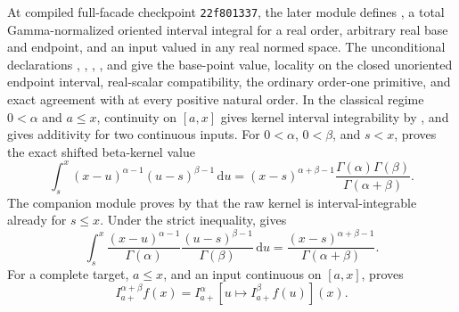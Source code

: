 \documentclass[11pt,oneside]{article}
\theoremstyle{definition}
\theoremstyle{remark}
\newcommand{\dd}{\,\mathrm d}
\newcommand{\1}{\mathbf 1}
\begin{document}
\begin{statusbox}
At compiled full-facade checkpoint \texttt{22f801337}, the later module
 defines
, a total Gamma-normalized oriented interval integral for
a real order, arbitrary real base and endpoint, and an input valued in any real normed
space.  The unconditional declarations
,
,
,
, and
 give the base-point value, locality on the
closed unoriented endpoint interval, real-scalar compatibility, the ordinary order-one
primitive, and exact agreement with  at every positive natural
order.  In the classical regime \(0<\alpha\) and \(a\le x\), continuity on \([a,x]\)
gives kernel interval integrability by
, and
 gives additivity for two continuous inputs.
For \(0<\alpha\), \(0<\beta\), and \(s<x\),
 proves the exact shifted
beta-kernel value
\begin{equation}
 \int_s^x(x-u)^{\alpha-1}(u-s)^{\beta-1}\dd u
 =(x-s)^{\alpha+\beta-1}
   \frac{\Gamma(\alpha)\Gamma(\beta)}{\Gamma(\alpha+\beta)}.
 \label{p0:eq:fractional-volterra-beta-kernel}
\end{equation}
The companion module  proves by
 that the raw kernel is
interval-integrable already for \(s\le x\).  Under the strict inequality,
 gives
\begin{equation}
 \int_s^x
 \frac{(x-u)^{\alpha-1}}{\Gamma(\alpha)}
 \frac{(u-s)^{\beta-1}}{\Gamma(\beta)}\dd u
 =\frac{(x-s)^{\alpha+\beta-1}}{\Gamma(\alpha+\beta)}.
 \label{p0:eq:fractional-volterra-normalized-beta-kernel}
\end{equation}
For a complete target, \(a\le x\), and an input continuous on \([a,x]\),
 proves
\begin{equation}
 I_{a+}^{\alpha+\beta}f(x)
 =I_{a+}^{\alpha}\!\left[u\mapsto I_{a+}^{\beta}f(u)\right](x).
 \label{p0:eq:fractional-volterra-semigroup}
\end{equation}


\end{statusbox}
\end{document}
